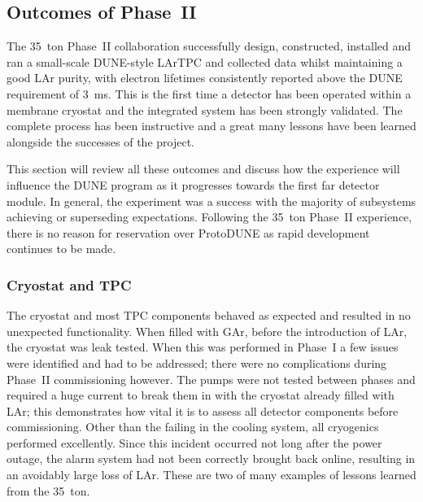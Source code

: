 \subsection{Outcomes of Phase~II}\label{sec:35tonPhaseIIOutcomes}

The 35~ton Phase~II collaboration successfully design, constructed, installed and ran a small-scale DUNE-style LArTPC and collected data whilst maintaining a good LAr purity, with electron lifetimes consistently reported above the DUNE requirement of 3~ms.  This is the first time a detector has been operated within a membrane cryostat and the integrated system has been strongly validated.  The complete process has been instructive and a great many lessons have been learned alongside the successes of the project.

This section will review all these outcomes and discuss how the experience will influence the DUNE program as it progresses towards the first far detector module.  In general, the experiment was a success with the majority of subsystems achieving or superseding expectations.  Following the 35~ton Phase~II experience, there is no reason for reservation over ProtoDUNE as rapid development continues to be made.

\subsubsection{Cryostat and TPC}\label{sec:35tonPhaseIIOutcomesCryostatTPC}

The cryostat and most TPC components behaved as expected and resulted in no unexpected functionality.  When filled with GAr, before the introduction of LAr, the cryostat was leak tested.  When this was performed in Phase~I a few issues were identified and had to be addressed; there were no complications during Phase~II commissioning however.  The pumps were not tested between phases and required a huge current to break them in with the cryostat already filled with LAr; this demonstrates how vital it is to assess all detector components before commissioning.  Other than the failing in the cooling system, all cryogenics performed excellently.  Since this incident occurred not long after the power outage, the alarm system had not been correctly brought back online, resulting in an avoidably large loss of LAr.  These are two of many examples of lessons learned from the 35~ton.

